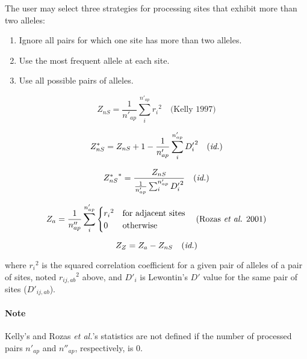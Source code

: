 \documentclass{scrartcl}
\begin{document}
The user may select three strategies for processing sites that exhibit
more than two alleles:

\begin{enumerate}
    \item Ignore all pairs for which one site has more than two alleles.
    \item Use the most frequent allele at each site.
    \item Use all possible pairs of alleles.
\end{enumerate}

\begin{displaymath}
    Z_{nS} = \frac{1}{n'_{ap}} \sum_i^{n'_{ap}} {r_i}^2 \quad \text{(Kelly 1997)}
\end{displaymath}

\begin{displaymath}
    Z^*_{nS} = Z_{nS} + 1 - \frac{1}{n'_{ap}}\sum_i^{n'_{ap}} {D'_i}^2 \quad \text{(\textit{id.})}
\end{displaymath}

\begin{displaymath}
    {Z^*_{nS}}^* = \frac {Z_{nS}} {\frac {1} {n'_{ap}} \sum_i^{n'_{ap}} {D'_i}^2} \quad \text{(\textit{id.})}
\end{displaymath}

\begin{displaymath}
    Z_a = \frac{1}{n''_{ap}} \sum_i^{n'_{ap}} 
        \begin{cases}
            {r_i}^2  &  \text{for adjacent sites} \\
            0        &  \text{otherwise}
        \end{cases} \quad \text{(Rozas \textit{et al.} 2001)}
\end{displaymath}

\begin{displaymath}
    Z_Z = Z_a - Z_{nS} \quad \text{(\textit{id.})}
\end{displaymath}

where ${r_i}^2$ is the squared correlation coefficient for a given pair
of alleles of a pair of sites, noted ${r_{ij,ab}}^2$ above, and $D'_i$
is Lewontin's $D'$ value for the same pair of sites ($D'_{ij,ab}$).

\paragraph{Note} Kelly's and Rozas \textit{et al.}'s  statistics are
not defined if the number of processed pairs $n'_{ap}$ and $n''_{ap}$,
respectively, is 0.
\end{document}

